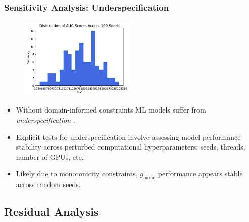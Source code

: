 \documentclass[11pt,
               aspectratio=169,
               hyperref={colorlinks}
               ]{beamer}
\begin{document}
			\begin{frame}[t]
				
				\frametitle{\textbf{Sensitivity Analysis}: Underspecification}
				\vspace{-15pt}
				\begin{figure}
					\begin{center}
						\includegraphics[height=110pt]{../img/under_spec.png}
					\end{center}
				\end{figure}	
				\vspace{-10pt}
				\begin{itemize}\scriptsize
					\item Without domain-informed constraints ML models suffer from  \textit{underspecification} \cite{underspec}.
					\item Explicit tests for underspecification involve assessing model performance stability across perturbed computational hyperparameters: seeds, threads, number of GPUs, etc.
					\item Likely due to monotonicity constraints, $g_{\text{mono}}$ performance appears stable across random seeds. 
				\end{itemize}
				\normalsize
				
			\end{frame}
			
		\subsection{Residual Analysis}
\end{document}
